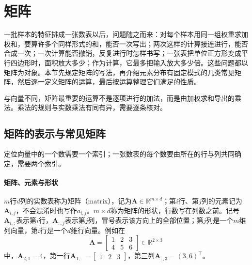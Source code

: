 
\section{矩阵}
\label{sec:ls-matrices}

一批样本的特征排成一张数表以后，问题随之而来：对每个样本用同一组权重求加权和，要算许多个同样形式的和，能否一次写出；两次这样的计算接连进行，能否合成一次；一次计算能否撤销，反复进行时怎样书写；一张表把单位正方形变成平行四边形时，面积放大多少；作为计算，它最多把输入放大多少倍。这些问题都以矩阵为对象。本节先规定矩阵的写法，再介绍元素分布有固定模式的几类常见矩阵，然后逐一定义矩阵的运算，最后按运算整理它们满足的性质。

与向量不同，矩阵最重要的运算不是逐项进行的加法，而是由加权求和导出的乘法。乘法的规则与实数乘法有同有异，需要逐条核对。

\subsection{矩阵的表示与常见矩阵}
\label{sec:ls-matrix-representation}

定位向量中的一个数需要一个索引；一张数表的每个数要由所在的行与列共同确定，需要两个索引。

\paragraph{矩阵、元素与形状}
$m$行$d$列的实数表称为矩阵（matrix），记为$\bm A\in\mathbb R^{m\times d}$；第$i$行、第$j$列的元素记为$\bm A_{i,j}$，不会混淆时也写作$a_{i,j}$。$m\times d$称为矩阵的形状，行数写在列数之前。记号$\bm A_{i,:}$表示第$i$行，$\bm A_{:,j}$表示第$j$列，冒号表示该方向上的全部位置；第$j$列是一个$m$维列向量，第$i$行是一个$d$维行向量。例如在
\[
 \bm A=\begin{bmatrix}1&2&3\\4&5&6\end{bmatrix}\in\mathbb R^{2\times3}
\]
中，$\bm A_{2,1}=4$，第一行$\bm A_{1,:}=\left[\begin{smallmatrix}1&2&3\end{smallmatrix}\right]$，第三列$\bm A_{:,3}=(3,6)^\top$。

